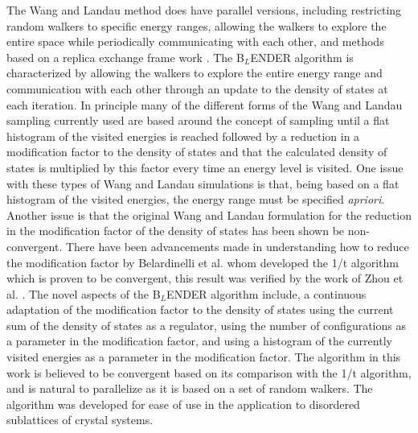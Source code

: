 \documentclass[aps,pre,reprint,superscriptaddress,showkeys]{revtex4-1}
\begin{document}
    The Wang and Landau method does have parallel versions, including  restricting random walkers to specific energy ranges, allowing the walkers to explore the entire space while periodically communicating with each other, and methods based on a replica exchange frame work \cite{MP_Wang_Landau,P_imp_Wang_Landau, Hframe_Wang_Landau, Scalable_replica_exchange}.  The B$_{L}$ENDER algorithm is characterized by allowing the walkers to explore the entire energy range and communication with each other through an update to the density of states at each iteration.  In principle many of the different forms of the Wang and Landau sampling currently used are based around the concept of sampling until a flat histogram of the visited energies is reached followed by a reduction in a modification factor to the density of states and that the calculated density of states  is multiplied by this factor every time an energy level  is visited.  One issue with these types of Wang and Landau simulations is that, being based on a flat histogram of the visited energies, the energy range must be specified \textit{apriori}. Another issue is that the original Wang and Landau formulation for the reduction in the modification factor of the  density of states has been shown be non-convergent\cite{Non_convergent_WL,Non_convergent_WL_2,non_convergence_multiple_random_walkers,Optimal_modification}.   There have been advancements made in understanding how to reduce the modification factor by Belardinelli et al. \cite{saturation} whom developed the 1/t algorithm which is proven to be convergent, this result was verified by the work of Zhou et al. \cite{Optimal_modification}. The novel aspects of the B$_{L}$ENDER algorithm include, a continuous adaptation of the modification factor to the  density of states using the current sum of the density of states as a regulator, using the number of configurations as a parameter in the modification factor, and using a histogram of the currently visited energies as a parameter in the modification factor.  The algorithm in this work is believed to be convergent based on its comparison with the 1/t algorithm, and is natural to parallelize as it is based on a set of random walkers. The algorithm was developed for ease of use in the application to disordered sublattices of crystal systems. 
\end{document}
